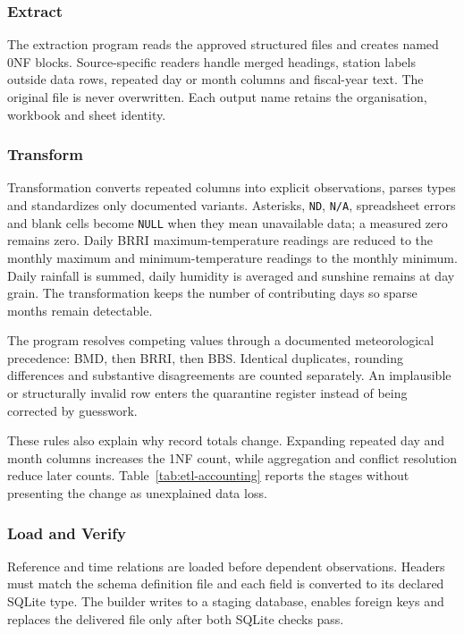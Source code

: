 \subsubsection{Extract}

The extraction program reads the \mSourceFiles{} approved structured files and
creates \mSourceBlocks{} named 0NF blocks. Source-specific readers handle
merged headings, station labels outside data rows, repeated day or month
columns and fiscal-year text. The original file is never overwritten. Each
output name retains the organisation, workbook and sheet identity.

\subsubsection{Transform}

Transformation converts repeated columns into explicit observations, parses
types and standardizes only documented variants. Asterisks, \texttt{ND},
\texttt{N/A}, spreadsheet errors and blank cells become \texttt{NULL} when
they mean unavailable data; a measured zero remains zero. Daily BRRI
maximum-temperature readings are reduced to the monthly maximum and
minimum-temperature readings to the monthly minimum. Daily rainfall is summed,
daily humidity is averaged and sunshine remains at day grain. The
transformation keeps the number of contributing days so sparse months remain
detectable.

The program resolves competing values through a documented meteorological
precedence: BMD, then BRRI, then BBS. Identical duplicates, rounding
differences and substantive disagreements are counted separately. An
implausible or structurally invalid row enters the quarantine register instead
of being corrected by guesswork.

These rules also explain why record totals change. Expanding repeated day and
month columns increases the 1NF count, while aggregation and conflict
resolution reduce later counts. Table~\ref{tab:etl-accounting} reports the
stages without presenting the change as unexplained data loss.

\subsubsection{Load and Verify}

Reference and time relations are loaded before dependent observations.
Headers must match the schema definition file and each field is converted to
its declared SQLite type. The builder writes to a staging database, enables
foreign keys and replaces the delivered file only after both SQLite checks
pass.

